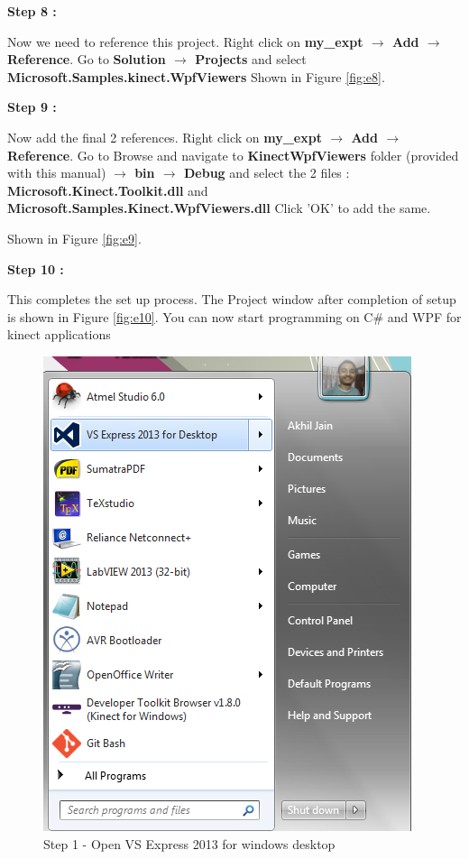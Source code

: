 \begin{flushleft}
\medskip

\textbf{Step 8 :}

\medskip
Now we need to reference this project.
Right click on \textbf{my\_expt $\rightarrow$ Add $\rightarrow$ Reference}.
Go to \textbf{Solution $\rightarrow$ Projects} and select \textbf{Microsoft.Samples.kinect.WpfViewers}
Shown in Figure \ref{fig:e8}.


\medskip

\textbf{Step 9 :}

\medskip
Now add the final 2 references.
Right click on \textbf{my\_expt $\rightarrow$ Add $\rightarrow$ Reference}.
Go to Browse and navigate to 
\textbf{KinectWpfViewers} folder (provided with this manual) \textbf{$\rightarrow$ bin $\rightarrow$ Debug}
and select the 2 files :
\textbf{Microsoft.Kinect.Toolkit.dll} and
\textbf{Microsoft.Samples.Kinect.WpfViewers.dll}
Click 'OK' to add the same.

Shown in Figure \ref{fig:e9}.
\medskip

\textbf{Step 10 :}

\medskip
This completes the set up process. The Project window after completion of setup is shown in Figure \ref{fig:e10}.
You can now start programming on C\# and WPF for kinect applications

\medskip

\begin{figure}
\begin{center}
\includegraphics[scale=0.6]{s1}
\end{center}
\caption{Step 1 - Open VS Express 2013 for windows desktop}
\label{fig:e1}
\end{figure}


\end{flushleft}
